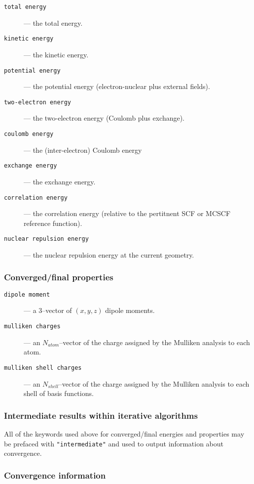 \begin{description}
\item [\verb+total energy+] --- the total energy.
\item [\verb+kinetic energy+] --- the kinetic energy.
\item [\verb+potential energy+] --- the potential energy
  (electron-nuclear plus external fields).
\item [\verb+two-electron energy+] --- the two-electron energy
(Coulomb plus exchange).
\item [\verb+coulomb energy+] --- the (inter-electron) Coulomb
  energy
\item [\verb+exchange energy+] --- the exchange energy.
\item [\verb+correlation energy+] --- the correlation energy
  (relative to the pertitnent SCF or MCSCF reference function).
\item [\verb+nuclear repulsion energy+] --- the nuclear repulsion
  energy at the current geometry.
\end{description}

\subsubsection{Converged/final properties}

\begin{description}
\item [\verb+dipole moment+] --- a 3--vector of $(x,y,z)$ dipole
  moments.
\item [\verb+mulliken charges+] --- an $N_{atom}$--vector of the charge
  assigned by the Mulliken analysis to each atom.
\item [\verb+mulliken shell charges+] --- an $N_{shell}$--vector of
  the charge assigned by the Mulliken analysis to each shell of basis
  functions. 
\end{description}

\subsubsection{Intermediate results within iterative algorithms}

All of the keywords used above for converged/final energies and
properties may be prefaced with \verb+"intermediate"+ and used
to output information about convergence.

\subsubsection{Convergence information}

